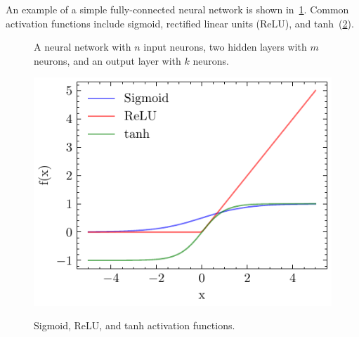\documentclass[ppgc,diss,english]{iiufrgs}
\begin{document}
An example of a simple fully-connected neural network is shown in~\cref{fig:neural-network}. Common activation functions include sigmoid, rectified linear units (ReLU), and tanh~(\cref{fig:activation-functions}).

\begin{figure}[tb]
\caption[A fully-connected neural network]{A neural network with $n$ input neurons, two hidden layers with $m$ neurons, and an output layer with $k$ neurons.}
\vspace{\baselineskip}
\centering
{}
\label{fig:neural-network}
\end{figure}

\begin{figure}[tb]
\caption[Common activation functions]{Sigmoid, ReLU, and tanh activation functions.}
\vspace{\baselineskip}
\centering
\includegraphics[scale=1.0]{img/sigmoid-relu-tanh}
\label{fig:activation-functions}
\end{figure}
\end{document}
